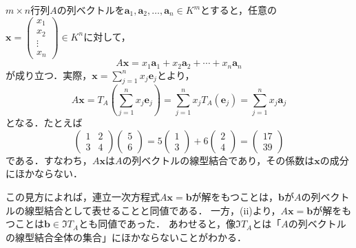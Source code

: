 \begin{remark}[$A\bm{x}$は列ベクトルの線型結合]
  $m \times n$行列$A$の列ベクトルを$\bm{a}_1, \bm{a}_2, \dots, \bm{a}_n \in K^m$とすると，任意の$\bm{x} = \begin{pmatrix} x_1 \\ x_2 \\ \vdots \\ x_n \end{pmatrix} \in K^n$に対して，
  \begin{equation}
    A\bm{x} = x_1 \bm{a}_1 + x_2 \bm{a}_2 + \cdots + x_n \bm{a}_n \label{eq:Axは列の線型結合}
  \end{equation}
  が成り立つ．実際，$\bm{x} = \sum_{j=1}^{n} x_j \bm{e}_j$とより，
  \[
    A\bm{x} = T_A\left(\sum_{j=1}^{n} x_j \bm{e}_j\right)
    = \sum_{j=1}^{n} x_j T_A(\bm{e}_j)
    = \sum_{j=1}^{n} x_j \bm{a}_j
  \]
  となる．たとえば
  \[
    \begin{pmatrix} 1 & 2 \\ 3 & 4 \end{pmatrix}
    \begin{pmatrix} 5 \\ 6 \end{pmatrix}
    = 5 \begin{pmatrix} 1 \\ 3 \end{pmatrix} + 6 \begin{pmatrix} 2 \\ 4 \end{pmatrix}
    = \begin{pmatrix} 17 \\ 39 \end{pmatrix}
  \]
  である．すなわち，$A\bm{x}$は$A$の列ベクトルの線型結合であり，その係数は$\bm{x}$の成分にほかならない．

  この見方によれば，連立一次方程式$A\bm{x} = \bm{b}$が解をもつことは，$\bm{b}$が$A$の列ベクトルの線型結合として表せることと同値である．
  一方，(ii)より，$A\bm{x} = \bm{b}$が解をもつことは$\bm{b} \in \Im T_A$とも同値であった．
  あわせると，像$\Im T_A$とは「$A$の列ベクトルの線型結合全体の集合」にほかならないことがわかる．
\end{remark}

